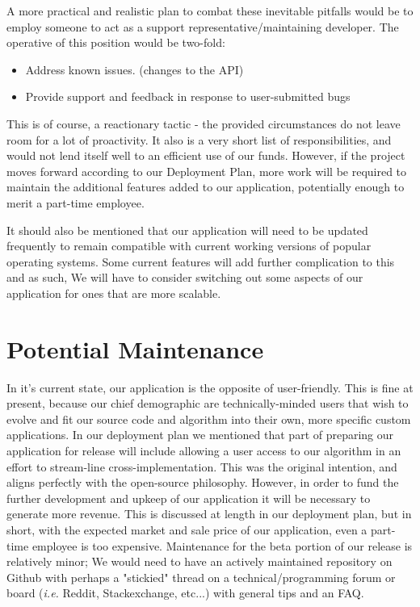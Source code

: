 \documentclass{roffin}
\begin{document}
A more practical and realistic plan to combat these inevitable pitfalls would be to employ someone to act as a support representative/maintaining developer. The operative of this position would be two-fold:
    \begin{itemize}
        \item Address known issues. (changes to the API) 
        \item Provide support and feedback in response to user-submitted bugs
    \end{itemize}


This is of course, a reactionary tactic - the provided circumstances do not leave room for a lot of proactivity. It also is a very short list of responsibilities, and would not lend itself well to an efficient use of our funds.  However, if the project moves forward according to our Deployment Plan, more work will be required to maintain the additional features added to our application, potentially enough to merit a part-time employee. 

It should also be mentioned that our application will need to be updated frequently to remain compatible with current working versions of popular operating systems. Some current features will add further complication to this and as such, We will have to consider switching out some aspects of our application for ones that are more scalable. 


\section{Potential Maintenance}

In it's current state, our application is the opposite of user-friendly. This is fine at present, because our chief demographic are technically-minded users that wish to evolve and fit our source code and algorithm into their own, more specific custom applications. In our deployment plan we mentioned that part of preparing our application for release will include allowing a user access to our algorithm in an effort to stream-line cross-implementation. This was the original intention, and aligns perfectly with the open-source philosophy. However, in order to fund the further development and upkeep of our application it will be necessary to generate more revenue. This is discussed at length in our deployment plan, but in short, with the expected market and sale price of our application, even a part-time employee is too expensive.  Maintenance for the beta portion of our release is relatively minor; We would need to have an actively maintained repository on Github with perhaps a "stickied" thread on a technical/programming forum or board (\textit{i.e.} Reddit, Stackexchange, etc...) with general tips and an FAQ.
\end{document}
